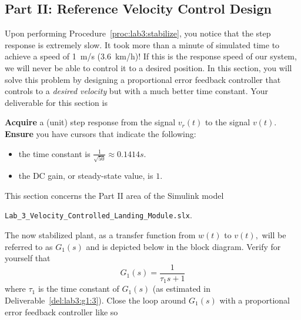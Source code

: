 \subsection{Part II: Reference Velocity Control Design}\label{Lab:3:Part:II}
Upon performing Procedure~\ref{proc:lab3:stabilize}, you notice that the step response is extremely slow.
It took more than a minute of simulated time to achieve a speed of \SI{1}{m/s} (\SI{3.6}{km/h})!
If this is the response speed of our system, we will never be able to control it to a desired position.
In this section, you will solve this problem by designing a proportional error feedback controller that controls to a \emph{desired velocity} but with a much better time constant.
Your deliverable for this section is
%
\begin{deliverable}[label={del:lab3:g2:1}]
  \textbf{Acquire} a (unit) step response from the signal \(v_r(t)\) to the signal \(v(t).\)
  \textbf{Ensure} you have cursors that indicate the following:
  \begin{itemize}
    \item{the time constant is \(\frac{1}{\sqrt{50}} \approx 0.1414 s.\)}
    \item{the DC gain, or steady-state value, is \(1.\)}
  \end{itemize}
\end{deliverable}
%
This section concerns the Part II area of the Simulink model
\begin{center}
  \texttt{Lab\_3\_Velocity\_Controlled\_Landing\_Module.slx}.
\end{center}
The now stabilized plant, as a transfer function from \(w(t)\) to \(v(t),\) will be referred to as \(G_1(s)\) and is depicted below in the block diagram.
Verify for yourself that
\[
  G_1(s) = \frac{1}{\tau_1 s + 1}
\]
where \(\tau_1\) is the time constant of \(G_1(s)\) (as estimated in Deliverable~\ref{del:lab3:g1:3}).
Close the loop around \(G_1(s)\) with a proportional error feedback controller like so
%
